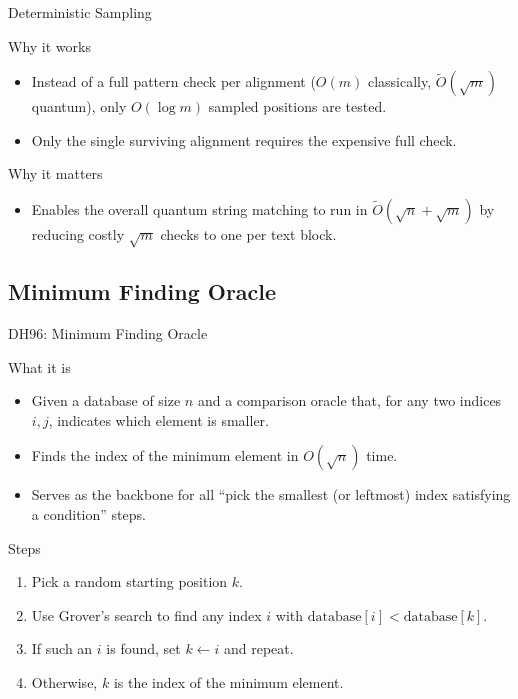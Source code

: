 \documentclass{beamer}
\begin{document}
\begin{frame}{Deterministic Sampling}
    \begin{block}{Why it works}
        \begin{itemize}
            \item Instead of a full pattern check per alignment (\(O(m)\) classically, \(\tilde O(\sqrt m)\) quantum), only \(O(\log m)\) sampled positions are tested.
            \item Only the single surviving alignment requires the expensive full check.
        \end{itemize}
    \end{block}
    \begin{block}{Why it matters}
        \begin{itemize}
            \item Enables the overall quantum string matching to run in \(\tilde O(\sqrt n + \sqrt m)\) by reducing costly \(\sqrt m\) checks to one per text block.
        \end{itemize}
    \end{block}
\end{frame}


\subsection{Minimum Finding Oracle}
\begin{frame}{DH96: Minimum Finding Oracle}
    \begin{block}{What it is}
        \begin{itemize}
            \item Given a database of size \(n\) and a comparison oracle
                  that, for any two indices \(i,j\), indicates which element is smaller.
            \item Finds the index of the minimum element in \(O(\sqrt{n})\) time.
            \item Serves as the backbone for all “pick the smallest (or leftmost) index satisfying a condition” steps.
        \end{itemize}
    \end{block}

    \begin{block}{Steps}
        \begin{enumerate}
            \item Pick a random starting position \(k\).
            \item Use Grover's search to find any index \(i\) with \(\text{database}[i] < \text{database}[k]\).
            \item If such an \(i\) is found, set \(k \leftarrow i\) and repeat.
            \item Otherwise, \(k\) is the index of the minimum element.
        \end{enumerate}
    \end{block}
\end{frame}
\end{document}
